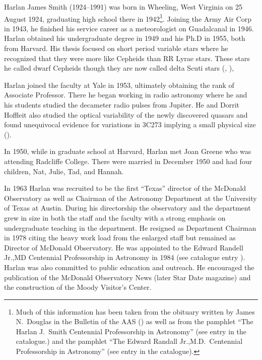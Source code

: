 
Harlan James Smith (1924--1991) was born in Wheeling, West Virginia on
25 August 1924, graduating high school there in 1942\footnote{Much of
this information has been taken from the obituary written by James
N.~Douglas in the Bulletin of the AAS (\cite{Douglas1992Harlan}) as
well as from the pamphlet ``The Harlan J.~Smith Centennial
Professorship in Astronomy'' (see entry  in the
catalogue.) and the pamphlet ``The Edward Randall Jr.,M.D.~Centennial
Professorship in Astronomy'' (see entry  in the
catalogue).}. Joining the Army Air Corp in 1943, he finished his
service career as a meteorologist on Guadalcanal in 1946.  Harlan
obtained his undergraduate degree in 1949 and his Ph.D in 1955, both
from Harvard. His thesis focused on short period variable stars where he
recognized that they were more like Cepheids than RR Lyrae stars.
These stars he called dwarf Cepheids though they are now called delta
Scuti stars (\cite{HJS1955}, \cite{HJSPhD}),

Harlan joined the faculty at Yale in 1953, ultimately obtaining the rank of
Associate Professor. There he began working in radio astronomy where
he and his students studied the decameter radio pulses from
Jupiter. He and Dorrit Hoffleit also studied the optical variability of
the newly discovered quasars and found unequivocal evidence for
variations in 3C273 implying a small physical size
(\cite{HJS1963}).

In 1950, while in graduate school at Harvard, Harlan met Joan Greene
who was attending Radcliffe College. There were married in December
1950 and had four children, Nat, Julie, Tad, and Hannah.

In 1963 Harlan was recruited to be the first ``Texas'' director of the
McDonald Observatory as well as Chairman of the Astronomy Department
at the University of Texas at Austin. During his directorship the
observatory and the department grew in size in both the staff and the
faculty with a strong emphasis on undergraduate teaching in the
department. He resigned as Department Chairman in 1978 citing the
heavy work load from the enlarged staff but remained as Director of
McDonald Observatory. He was appointed to the Edward Randell Jr.,MD
Centennial Professorship in Astronomy in 1984 (see catalogue
entry ).  Harlan was also committed to public education and
outreach.  He encouraged the publication of the McDonald Observatory
News (later Star Date magazine) and the construction of the Moody
Visitor's Center.

